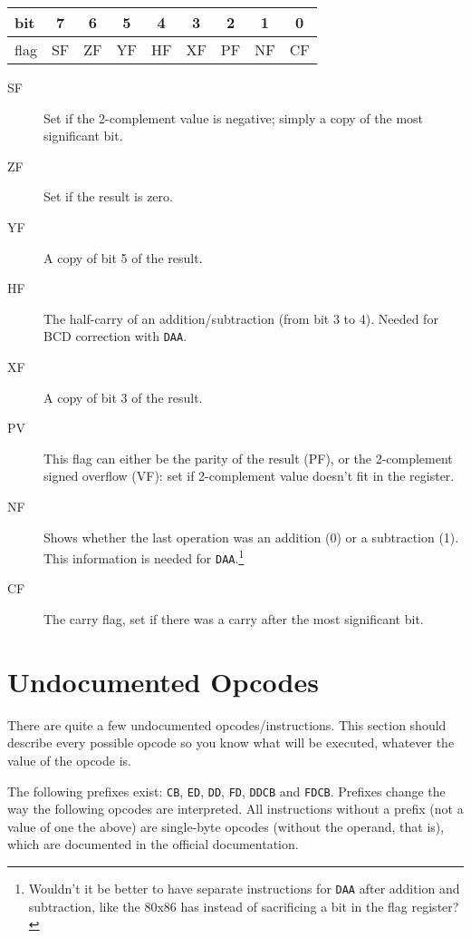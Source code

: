 \begin{tabular}{|l|c|c|c|c|c|c|c|c|} 
	\hline
	bit & 7 & 6 & 5 & 4 & 3 & 2 & 1 & 0 \instrt\instrb \\
	\hline
	flag & SF & ZF & YF & HF & XF & PF & NF & CF \instrt\instrb \\ 
	\hline
\end{tabular}

\begin{description}

	\item[SF]
	Set if the 2-complement value is negative; simply a copy of the most significant bit.

	\item[ZF]
	Set if the result is zero.

	\item[YF]
	A copy of bit 5 of the result.

	\item[HF]
	The half-carry of an addition/subtraction (from bit 3 to 4). Needed for BCD correction with {\tt DAA}.

	\item[XF]
	A copy of bit 3 of the result.

	\item[PV]
	This flag can either be the parity of the result (PF), or the 2-complement signed overflow (VF): set if 2-complement value doesn't fit in the register.

	\item[NF]
	Shows whether the last operation was an addition (0) or a subtraction (1). This information is needed for {\tt DAA}.\footnote{Wouldn't it be better to have separate instructions for {\tt DAA} after addition and subtraction, like the 80x86 has instead of sacrificing a bit in the flag register?}

	\item[CF]
	The carry flag, set if there was a carry after the most significant bit.

\end{description}


\section{Undocumented Opcodes}

There are quite a few undocumented opcodes/instructions. This section should describe every possible opcode so you know what will be executed, whatever the value of the opcode is.

The following prefixes exist: {\tt CB}, {\tt ED}, {\tt DD}, {\tt FD}, {\tt DDCB} and {\tt FDCB}. Prefixes change the way the following opcodes are interpreted. All instructions without a prefix (not a value of one the above) are single-byte opcodes (without the operand, that is), which are documented in the official documentation.


